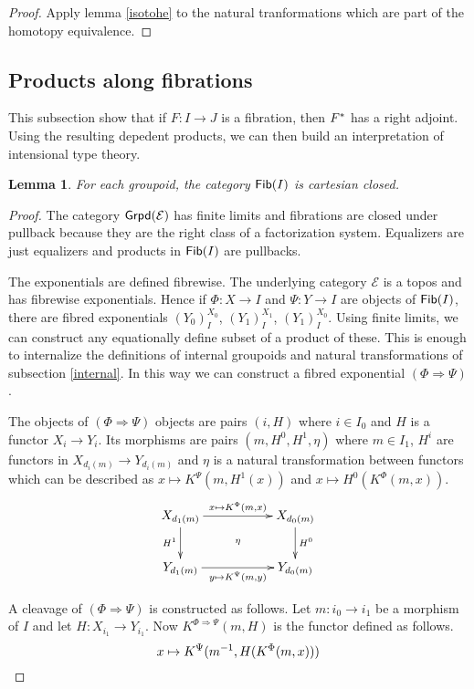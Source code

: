 \documentclass{amsart}
\theoremstyle{plain}
\newtheorem{lemma}[theorem]{Lemma}
\theoremstyle{definition}
\newcommand\hide[1]{}
\newcommand\cat\mathcal
\begin{document}
\begin{proof} Apply lemma \ref{isotohe} to the natural tranformations which are part of the homotopy equivalence. \end{proof}

\subsection{Products along fibrations}
This subsection show that if $F:I\to J$ is a fibration, then $F^*$ has a right adjoint. Using the resulting depedent products, we can then build an interpretation of intensional type theory.

\begin{lemma} For each groupoid, the category $\mathsf{Fib}(I)$ is cartesian closed. \end{lemma}

\begin{proof}
The category $\grpd(\cat E)$ has finite limits and fibrations are closed under pullback because they are the right class of a factorization system. Equalizers are just equalizers and products in $\mathsf{Fib} (I)$ are pullbacks.

The exponentials are defined fibrewise. The underlying category $\cat E$ is a topos and has fibrewise exponentials. Hence if $\Phi:X\to I$ and $\Psi:Y\to I$ are objects of $\mathsf{Fib}(I)$, there are fibred exponentials $(Y_0)^{X_0}_I$, $(Y_1)^{X_1}_I$, $(Y_1)^{X_0}_I$. Using finite limits, we can construct any equationally define subset of a product of these. This is enough to internalize the definitions of internal groupoids and natural transformations of subsection \ref{internal}. In this way we can construct a fibred exponential $(\Phi\Rightarrow \Psi)$. 

The objects of $(\Phi\Rightarrow \Psi)$ objects are pairs $(i,H)$ where $i\in I_0$ and $H$ is a functor $X_i \to Y_i$. Its morphisms are pairs $(m,H^0,H^1,\eta)$ where $m\in I_1$, $H^i$ are functors in $X_{d_i(m)} \to Y_{d_i(m)}$ and $\eta$ is a natural transformation between functors which can be described as $x\mapsto K^\Psi(m,H^1(x))$ and $x\mapsto H^0(K^\Phi(m,x))$.
\[\xymatrix{ 
X_{d_1(m)}\ar[d]_{H^1} \ar[rr]^{x\mapsto K^\Phi(m,x)} &\ar@{}[d]|\eta & X_{d_0(m)} \ar[d]^{H^0} \\
Y_{d_1(m)}\ar[rr]_{y\mapsto K^\Psi(m,y)} && Y_{d_0(m)}
}\]

A cleavage of $(\Phi\Rightarrow \Psi)$ is constructed as follows. Let $m:i_0\to i_1$ be a morphism of $I$ and let $H:X_{i_1}\to Y_{i_1}$. Now $K^{\Phi\Rightarrow \Psi}(m,H)$ is the functor defined as follows.
\[ x\mapsto K^\Psi(m^{-1},H(K^\Phi(m,x))) \]
\hide{aangeven waarom dit een exponential is?}
\hide{nu vrijwel zeker dat cleavages inbegrepen moeten worden. }
\end{proof}
\end{document}
